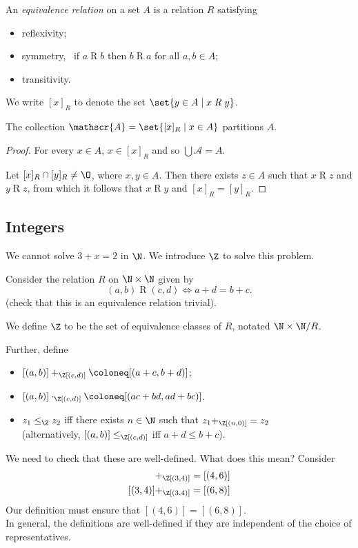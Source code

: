 \begin{definition}[Equivalence] \label{def:relations:equivalence}
    An \emph{equivalence relation} on a set $A$ is a relation $R$ satisfying
    \begin{itemize}
        \item reflexivity;
        \item symmetry, \ie\ if $a \mathrel{R} b$ then $b \mathrel{R} a$ for all
        $a, b \in A$;
        \item transitivity.
    \end{itemize}
\end{definition}
\begin{notation}
    We write $[x]_R$ to denote the set $\set{y \in A \mid x \mathrel{R} y}$.
\end{notation}
\begin{proposition}
    The collection $\mathscr{A} = \set{[x]_R \mid x \in A}$ partitions $A$.
\end{proposition}
\begin{proof}
    For every $x \in A$, $x \in [x]_R$ and so $\bigcup \mathscr{A} = A$.

    Let $[x]_R \cap [y]_R \ne \O$, where $x, y \in A$.
    Then there exists $z \in A$ such that $x \mathrel{R} z$ and
    $y \mathrel{R} z$, from which it follows that $x \mathrel{R} y$ and
    $[x]_R = [y]_R$.
\end{proof}

\subsection{Integers} \label{sec:integers}
We cannot solve $3 + x = 2$ in $\N$.
We introduce $\Z$ to solve this problem.

Consider the relation $R$ on $\N \times \N$ given by \[
    (a, b) \mathrel{R} (c, d) \iff a + d = b + c.
\] (check that this is an equivalence relation \textcolor{solved}{trivial}).
\begin{definition} \label{def:integers}
    We define $\Z$ to be the set of equivalence classes of $R$, notated
    $\N \times \N / R$.
\end{definition}
Further, define
\begin{itemize}
    \item $[(a, b)] +_\Z [(c, d)] \coloneq [(a + c, b + d)]$;
    \item $[(a, b)] \cdot_\Z [(c, d)] \coloneq [(ac + bd, ad + bc)]$.
    \item $z_1 \le_\Z z_2$ iff there exists $n \in \N$ such that
    $z_1 +_\Z [(n, 0)] = z_2$ \\
    (alternatively, $[(a, b)] \le_\Z [(c, d)]$ iff $a + d \le b + c$).
\end{itemize}
We need to check that these are well-defined.
What does this mean?
Consider \begin{align*}
    [(1, 2)] +_\Z [(3, 4)] &= [(4, 6)] \\
    [(3, 4)] +_\Z [(3, 4)] &= [(6, 8)]
\end{align*}
Our definition must ensure that $[(4, 6)] = [(6, 8)]$. \\
In general, the definitions are well-defined if they are independent of the
choice of representatives.
